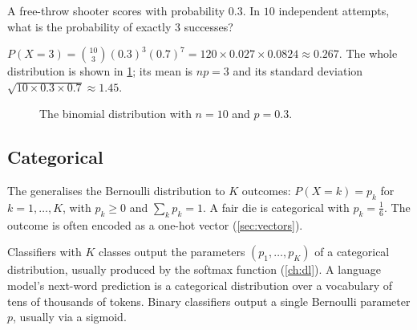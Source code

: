 \begin{example}
A free-throw shooter scores with probability $0.3$. In $10$ independent attempts,
what is the probability of exactly $3$ successes?

\sol $P(X = 3) = \binom{10}{3}(0.3)^3(0.7)^7 = 120\times0.027\times0.0824 \approx
0.267$. The whole distribution is shown in \cref{fig:binomial}; its mean is
$np = 3$ and its standard deviation $\sqrt{10\times0.3\times0.7} \approx 1.45$.
\end{example}

\begin{figure}[htbp]
\centering
{}
\caption{The binomial distribution with $n = 10$ and $p = 0.3$.}
\label{fig:binomial}
\end{figure}

\subsection{Categorical}

The  generalises the Bernoulli distribution to
$K$ outcomes: $P(X = k) = p_k$ for $k = 1, \dots, K$, with $p_k \ge 0$ and
$\sum_kp_k = 1$. A fair die is categorical with $p_k = \frac16$. The outcome is
often encoded as a one-hot vector (\cref{sec:vectors}).

\begin{mlnote}
Classifiers with $K$ classes output the parameters $(p_1, \dots, p_K)$ of a
categorical distribution, usually produced by the softmax function
(\cref{ch:dl}). A language model's next-word prediction is a categorical
distribution over a vocabulary of tens of thousands of tokens. Binary
classifiers output a single Bernoulli parameter $p$, usually via a sigmoid.
\end{mlnote}

